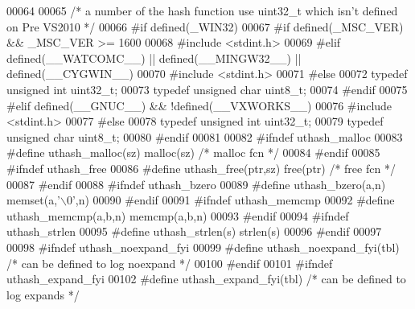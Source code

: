 \begin{DoxyCode}
00064 
00065 \textcolor{comment}{/* a number of the hash function use uint32\_t which isn't defined on Pre VS2010 */}
00066 \textcolor{preprocessor}{#if defined(\_WIN32)}
00067 \textcolor{preprocessor}{#if defined(\_MSC\_VER) && \_MSC\_VER >= 1600}
00068 \textcolor{preprocessor}{#include <stdint.h>}
00069 \textcolor{preprocessor}{#elif defined(\_\_WATCOMC\_\_) || defined(\_\_MINGW32\_\_) || defined(\_\_CYGWIN\_\_)}
00070 \textcolor{preprocessor}{#include <stdint.h>}
00071 \textcolor{preprocessor}{#else}
00072 \textcolor{keyword}{typedef} \textcolor{keywordtype}{unsigned} \textcolor{keywordtype}{int} uint32\_t;
00073 \textcolor{keyword}{typedef} \textcolor{keywordtype}{unsigned} \textcolor{keywordtype}{char} uint8\_t;
00074 \textcolor{preprocessor}{#endif}
00075 \textcolor{preprocessor}{#elif defined(\_\_GNUC\_\_) && !defined(\_\_VXWORKS\_\_)}
00076 \textcolor{preprocessor}{#include <stdint.h>}
00077 \textcolor{preprocessor}{#else}
00078 \textcolor{keyword}{typedef} \textcolor{keywordtype}{unsigned} \textcolor{keywordtype}{int} uint32\_t;
00079 \textcolor{keyword}{typedef} \textcolor{keywordtype}{unsigned} \textcolor{keywordtype}{char} uint8\_t;
00080 \textcolor{preprocessor}{#endif}
00081 
00082 \textcolor{preprocessor}{#ifndef uthash\_malloc}
00083 \textcolor{preprocessor}{#define uthash\_malloc(sz) malloc(sz)      }\textcolor{comment}{/* malloc fcn                      */}\textcolor{preprocessor}{}
00084 \textcolor{preprocessor}{#endif}
00085 \textcolor{preprocessor}{#ifndef uthash\_free}
00086 \textcolor{preprocessor}{#define uthash\_free(ptr,sz) free(ptr)     }\textcolor{comment}{/* free fcn                        */}\textcolor{preprocessor}{}
00087 \textcolor{preprocessor}{#endif}
00088 \textcolor{preprocessor}{#ifndef uthash\_bzero}
00089 \textcolor{preprocessor}{#define uthash\_bzero(a,n) memset(a,'\(\backslash\)0',n)}
00090 \textcolor{preprocessor}{#endif}
00091 \textcolor{preprocessor}{#ifndef uthash\_memcmp}
00092 \textcolor{preprocessor}{#define uthash\_memcmp(a,b,n) memcmp(a,b,n)}
00093 \textcolor{preprocessor}{#endif}
00094 \textcolor{preprocessor}{#ifndef uthash\_strlen}
00095 \textcolor{preprocessor}{#define uthash\_strlen(s) strlen(s)}
00096 \textcolor{preprocessor}{#endif}
00097 
00098 \textcolor{preprocessor}{#ifndef uthash\_noexpand\_fyi}
00099 \textcolor{preprocessor}{#define uthash\_noexpand\_fyi(tbl)          }\textcolor{comment}{/* can be defined to log noexpand  */}\textcolor{preprocessor}{}
00100 \textcolor{preprocessor}{#endif}
00101 \textcolor{preprocessor}{#ifndef uthash\_expand\_fyi}
00102 \textcolor{preprocessor}{#define uthash\_expand\_fyi(tbl)            }\textcolor{comment}{/* can be defined to log expands   */}\textcolor{preprocessor}{}

\end{DoxyCode}
